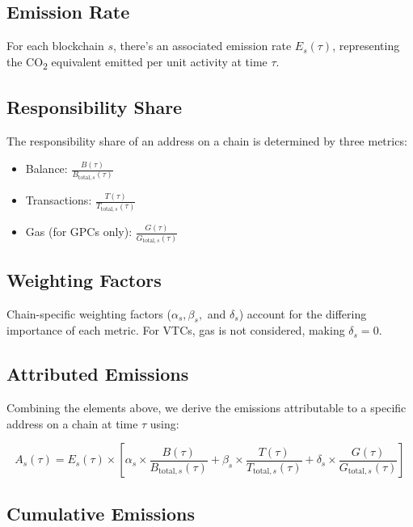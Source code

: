 \documentclass[12pt,a4paper]{report}
\begin{document}
\subsection{Emission Rate}

For each blockchain \( s \), there's an associated emission rate \( E_s(\tau) \), representing the CO\textsubscript{2} equivalent emitted per unit activity at time \( \tau \).

\subsection{Responsibility Share}

The responsibility share of an address on a chain is determined by three metrics:
\begin{itemize}
    \item Balance: \( \frac{B(\tau)}{B_{\text{total},s}(\tau)} \)
    \item Transactions: \( \frac{T(\tau)}{T_{\text{total},s}(\tau)} \)
    \item Gas (for GPCs only): \( \frac{G(\tau)}{G_{\text{total},s}(\tau)} \)
\end{itemize}

\subsection{Weighting Factors}

Chain-specific weighting factors (\( \alpha_s, \beta_s, \) and \( \delta_s \)) account for the differing importance of each metric. For VTCs, gas is not considered, making \( \delta_s = 0 \).

\subsection{Attributed Emissions}

Combining the elements above, we derive the emissions attributable to a specific address on a chain at time \( \tau \) using:

\[ A_s(\tau) = E_s(\tau) \times \left[ \alpha_s \times \frac{B(\tau)}{B_{\text{total},s}(\tau)} + \beta_s \times \frac{T(\tau)}{T_{\text{total},s}(\tau)} + \delta_s \times \frac{G(\tau)}{G_{\text{total},s}(\tau)} \right] \]

\subsection{Cumulative Emissions}
\end{document}
